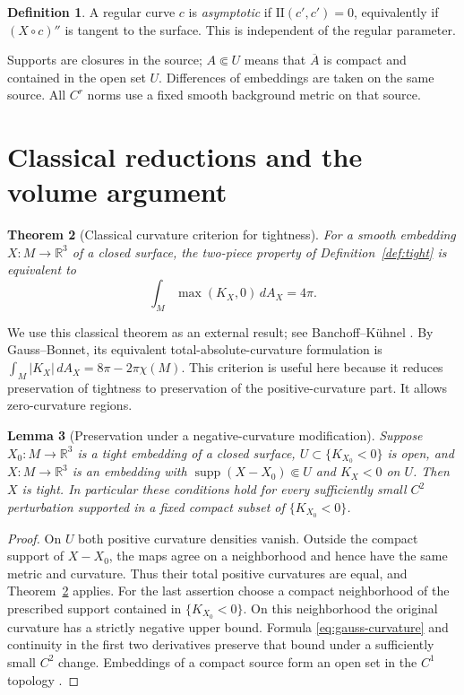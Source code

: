 \documentclass[11pt]{amsart}
\newtheorem{theorem}{Theorem}[section]
\newtheorem{lemma}[theorem]{Lemma}
\theoremstyle{definition}
\newtheorem{definition}[theorem]{Definition}
\newcommand{\R}{\mathbb R}
\DeclareMathOperator{\supp}{supp}
\begin{document}
\begin{definition}\label{def:asymptotic}
A regular curve $c$ is \emph{asymptotic} if
$\mathrm{II}(c',c')=0$, equivalently if $(X\circ c)''$ is tangent
to the surface. This is independent of the regular parameter.
\end{definition}

Supports are closures in the source; $A\Subset U$ means that
$\overline A$ is compact and contained in the open set $U$.
Differences of embeddings are taken on the same source.
All $C^r$ norms use a fixed smooth background metric on that source.

\section{Classical reductions and the volume argument}
\label{sec:reductions}

\begin{theorem}[Classical curvature criterion for tightness]
\label{thm:tightness}
For a smooth embedding $X:M\to\R^3$ of a closed surface, the two-piece
property of Definition~\ref{def:tight} is equivalent to
\begin{equation}\label{eq:tightness}
 \int_M\max(K_X,0)\,dA_X=4\pi.
\end{equation}
\end{theorem}

We use this classical theorem as an external result; see
Banchoff--K\"uhnel \cite[Definition~1.1.1, p.~57]{BK}.
By Gauss--Bonnet, its equivalent
total-absolute-curvature formulation is
$\int_M|K_X|\,dA_X=8\pi-2\pi\chi(M)$.
This criterion is useful here because it reduces preservation of
tightness to preservation of the positive-curvature part. It allows
zero-curvature regions.

\begin{lemma}[Preservation under a negative-curvature modification]
\label{lem:tight-preservation}
Suppose $X_0:M\to\R^3$ is a tight embedding of a closed surface,
$U\subset\{K_{X_0}<0\}$ is open, and $X:M\to\R^3$ is an embedding
with $\supp(X-X_0)\Subset U$ and $K_X<0$ on $U$.
Then $X$ is tight.
In particular these conditions hold for every sufficiently small
$C^2$ perturbation supported in a fixed compact subset of
$\{K_{X_0}<0\}$.
\end{lemma}
\begin{proof}
On $U$ both positive curvature densities vanish. Outside the compact
support of $X-X_0$, the maps agree on a neighborhood and hence have
the same metric and curvature. Thus their total positive curvatures
are equal, and Theorem~\ref{thm:tightness} applies.
For the last assertion choose a compact neighborhood of the prescribed
support contained in $\{K_{X_0}<0\}$. On this neighborhood the original
curvature has a strictly negative upper bound. Formula
\eqref{eq:gauss-curvature} and continuity in the first two derivatives
preserve that bound under a sufficiently small $C^2$ change.
Embeddings of a compact source form an open set in the $C^1$
topology \cite[Chapter~2, \S1, Theorem~1.4]{Hirsch}.
\end{proof}
\end{document}
